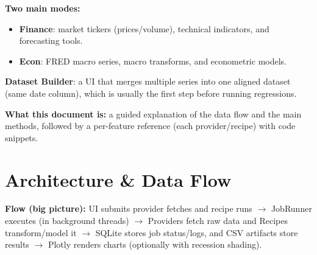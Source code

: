 \documentclass[11pt,a4paper]{article}
\begin{document}
\noindent\textbf{Two main modes:}
\begin{itemize}[leftmargin=2em]
  \item \textbf{Finance}: market tickers (prices/volume), technical indicators, and forecasting tools.
  \item \textbf{Econ}: FRED macro series, macro transforms, and econometric models.
\end{itemize}

\noindent\textbf{Dataset Builder}: a UI that merges multiple series into one aligned dataset (same date column), which is usually the first step before running regressions.

\vspace{0.5em}
\noindent\textbf{What this document is:} a guided explanation of the data flow and the main methods, followed by a per-feature reference (each provider/recipe) with code snippets.

\section{Architecture \& Data Flow}

\begin{center}
\end{center}

\textbf{Flow (big picture):} UI submits provider fetches and recipe runs $\to$ JobRunner executes (in background threads) $\to$ Providers fetch raw data and Recipes transform/model it $\to$ SQLite stores job status/logs, and CSV artifacts store results $\to$ Plotly renders charts (optionally with recession shading).
\end{document}
